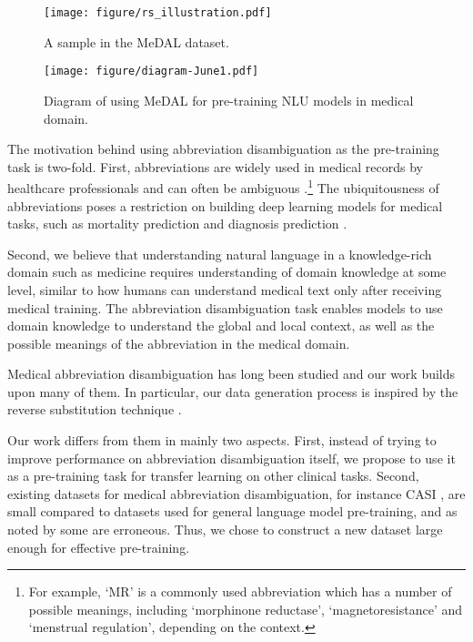\documentclass[11pt,a4paper]{article}
\begin{document}
\begin{figure}[t]
    \centering
    \hspace{-1.5em}\texttt{[image: figure/rs\_illustration.pdf]}
    \caption{A sample in the MeDAL dataset.}
    \label{fig:rs-illustrate}
\end{figure}

\begin{figure*}[ht]
\centering
\texttt{[image: figure/diagram-June1.pdf]}
\caption{\label{fig:diagram} Diagram of using MeDAL for pre-training NLU models in medical domain.}
\end{figure*}

The motivation behind using abbreviation disambiguation as the pre-training task is two-fold. First, abbreviations are widely used in medical records by healthcare professionals and can often be ambiguous \citep{Xu2007ANotes.,IslamajDogan2009UnderstandingAnalysis}.\footnote{For example, `MR' is a commonly used abbreviation which has a number of possible meanings, including `morphinone reductase', `magnetoresistance' and `menstrual regulation', depending on the context.} The ubiquitousness of abbreviations poses a restriction on building deep learning models for medical tasks, such as mortality prediction \citep{Grnarova2016NeuralPrediction} and diagnosis prediction \citep{Li2020InferringRecords}.

Second, we believe that understanding natural language in a knowledge-rich domain such as medicine requires understanding of domain knowledge at some level, similar to how humans can understand medical text only after receiving medical training. The abbreviation disambiguation task enables models to use domain knowledge to understand the global and local context, as well as the possible meanings of the abbreviation in the medical domain. 

Medical abbreviation disambiguation has long been studied \citep{Skreta2019TrainingDisambiguation, Li2019ADisambiguation, Finley2016TowardsData, Liu2018ExploitingExpansion,Joopudi2018AText, Jin2019DeepExpansion} and our work builds upon many of them. In particular, our data generation process is inspired by the reverse substitution technique \citep{Skreta2019TrainingDisambiguation, Finley2016TowardsData}. 

Our work differs from them in mainly two aspects. First, instead of trying to improve performance on abbreviation disambiguation itself, we propose to use it as a pre-training task for transfer learning on other clinical tasks. Second, existing datasets for medical abbreviation disambiguation, for instance CASI \citep{Moon2014AResources}, are small compared to datasets used for general language model pre-training, and as noted by \citet{Li2019ADisambiguation} some are erroneous. Thus, we chose to construct a new dataset large enough for effective pre-training.
\end{document}
